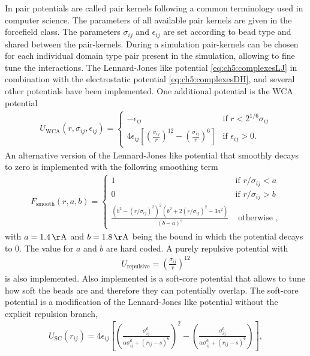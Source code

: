 \documentclass[12pt, twoside]{report}
\begin{document}
In \complexes pair potentials are called pair kernels following a common
terminology used in computer science. The parameters of all available pair
kernels are given in the forcefield class. The parameters \(\sigma_{ij}\) and
\(\epsilon_{ij}\) are set according to bead type and shared between the
pair-kernels. During a simulation pair-kernels can be chosen for each individual
domain type pair present in the simulation, allowing to fine tune the
interactions. The Lennard-Jones like potential \cref{eq:ch5:complexesLJ} in
combination with the electrostatic potential \cref{eq:ch5:complexesDH}, and
several other potentials have been implemented. One additional potential is the
\gls{WCA} potential \cite{Weeks1971}
\begin{align}
  \label{eq:ch5:wca}
  U_{\mathrm{WCA}} (r, \sigma_{ij}, \epsilon_{ij}) = \begin{cases} -\epsilon_{ij} &\mbox{if } r < 2^{1/6}\sigma_{ij} \\
    4\epsilon_{ij} \left[ \left( \frac{\sigma_{ij}}{r} \right)^{12} - \left( \frac{\sigma_{ij}}{r} \right)^{6}\right] &\mbox{if } \epsilon_{ij} > 0.
  \end{cases}
\end{align}
An alternative version of the Lennard-Jones like potential that smoothly decays
to zero is implemented with the following smoothing term
\begin{align}
  \label{eq:ch5:smooth} F_{\mathrm{smooth}}(r, a, b) =
  \begin{cases} 1 &\mbox{if } r/\sigma_{ij} < a \\ 0 &\mbox{if } r/\sigma_{ij} >
b \\ \frac{(b^2 - (r/\sigma_{ij})^2 )^2 (b^2 + 2 (r/\sigma_{ij})^2 - 3 a^2)}{ (b
- a)^3} &\mbox{ otherwise },
  \end{cases}
\end{align}
with \(a=\SI{1.4}{\AA}\) and \(b=\SI{1.8}{\AA}\) being the bound in which the
potential decays to 0. The value for \(a\) and \(b\) are hard coded. A purely
repulsive potential with
\begin{align}
  U_{\mathrm{repulsive}} = \left( \frac{\sigma_{ij}}{r}\right)^{12}
\end{align}
is also implemented. Also implemented is a soft-core potential \cite{Antes2010a}
that allows to tune how soft the beads are and therefore they can potentially
overlap. The soft-core potential is a modification of the Lennard-Jones like
potential without the explicit repulsion branch,
\begin{align}
  U_{\mathrm{SC}}(r_{ij}) = 4\epsilon_{ij}\left[
\left(\frac{\sigma_{ij}^6}{\alpha\sigma_{ij}^6 + (r_{ij}-s)^6}\right)^2 -
\left(\frac{\sigma_{ij}^6}{\alpha\sigma_{ij}^6 + (r_{ij}-s)^6}\right)\right],
\end{align}
\end{document}
